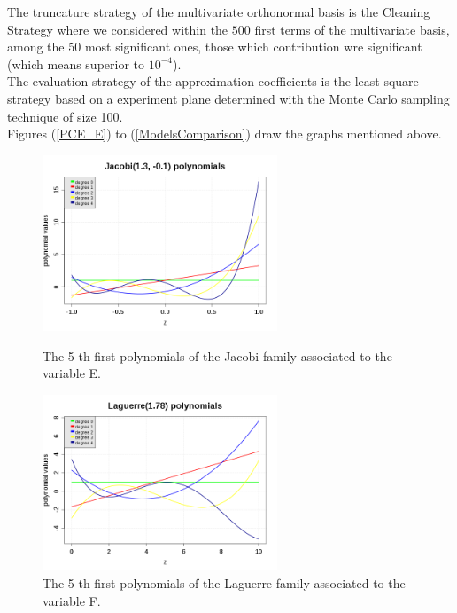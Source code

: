 The truncature strategy of the multivariate orthonormal basis is the Cleaning Strategy where we considered within the $500$ first terms of the multivariate basis, among the 50 most significant ones, those which contribution wre significant (which means superior to $10^{-4}$).\\

The evaluation strategy of the approximation coefficients is the least square strategy based on a experiment plane determined with the Monte Carlo sampling technique of size 100.\\

Figures (\ref{PCE_E}) to (\ref{ModelsComparison}) draw the graphs mentioned above.




\begin{figure}[H]
  \begin{minipage}{9cm}
    \begin{center}
      \includegraphics[width=7cm]{PCE_JacobiPolynomials_VariableE.png}
      \caption{The 5-th first polynomials of the Jacobi family associated to the variable E.}
      \label{PCE_E}
    \end{center}
  \end{minipage}
  \hfill
  \begin{minipage}{9cm}
    \begin{center}
      \includegraphics[width=7cm]{PCE_LaguerrePolynomials_VariableF.png}
      \caption{The 5-th first polynomials of the Laguerre family associated to the variable F.}
      \label{PCE_F}
    \end{center}
  \end{minipage}
\end{figure}

